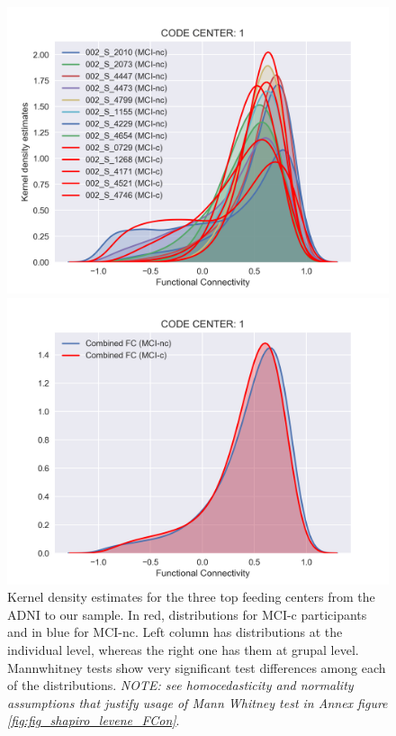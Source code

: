 \documentclass[a4paper,12pt]{elsarticle}  %
\begin{document}
\begin{figure}[h]
\begin{minipage}{.5\textwidth}
				\includegraphics[width=1\linewidth]{fig_distFC_individual_centre_1.png}
			\end{minipage}%
			\begin{minipage}{.5\textwidth}
				\centering
				\includegraphics[width=1\linewidth]{fig_distFC_mitjana_centre_1.png}
			\end{minipage}				
					
	
			
		\caption{Kernel density estimates for the three top feeding centers from the ADNI to our sample. In red, distributions for MCI-c participants and in blue for MCI-nc. Left column has distributions at the individual level, whereas the right one has them at grupal level. Mannwhitney tests show very significant test differences among each of the distributions. \textit{NOTE: see homocedasticity and normality assumptions that justify usage of Mann Whitney test in Annex figure \ref{fig:fig_shapiro_levene_FCon}}.}
		\label{fig:FCon_resultats}
	\end{figure}
\end{document}
